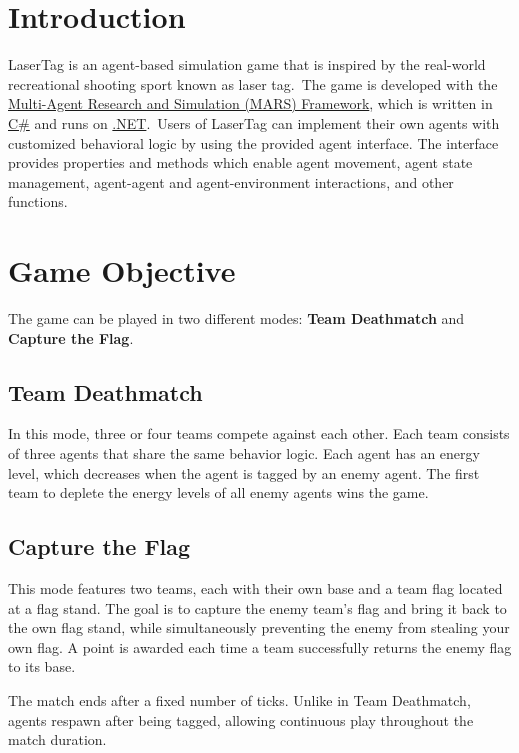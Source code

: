 \documentclass[a4paper,english,DIV=16,11pt,parskip=half,dvipsnames,listof=totoc,index=totoc,bibliography=totoc]{scrartcl}
\begin{document}
%
%
\tableofcontents
%
%
\clearpage
%
\section{Introduction}
LaserTag is an agent-based simulation game that is inspired by the real-world recreational shooting sport known as laser tag.~The game is developed with the \href{https://mars-group-haw.github.io/index.html}{Multi-Agent Research and Simulation (MARS) Framework}, which is written in \href{https://learn.microsoft.com/en-us/dotnet/csharp/}{C\#} and runs on \href{https://dotnet.microsoft.com/en-us/download}{.NET}.~Users of LaserTag can implement their own agents with customized behavioral logic by using the provided agent interface. The interface provides properties and methods which enable agent movement, agent state management, agent-agent and agent-environment interactions, and other functions.
%
\section{Game Objective} \label{sec:objective}

The game can be played in two different modes: \textbf{Team Deathmatch} and \textbf{Capture the Flag}.

\subsection*{Team Deathmatch}
In this mode, three or four teams compete against each other. Each team consists of three agents that share the same behavior logic. Each agent has an energy level, which decreases when the agent is tagged by an enemy agent. The first team to deplete the energy levels of all enemy agents wins the game.

\subsection*{Capture the Flag}
This mode features two teams, each with their own base and a team flag located at a flag stand. The goal is to capture the enemy team’s flag and bring it back to the own flag stand, while simultaneously preventing the enemy from stealing your own flag. A point is awarded each time a team successfully returns the enemy flag to its base.

The match ends after a fixed number of ticks. Unlike in Team Deathmatch, agents respawn after being tagged, allowing continuous play throughout the match duration.
\end{document}
